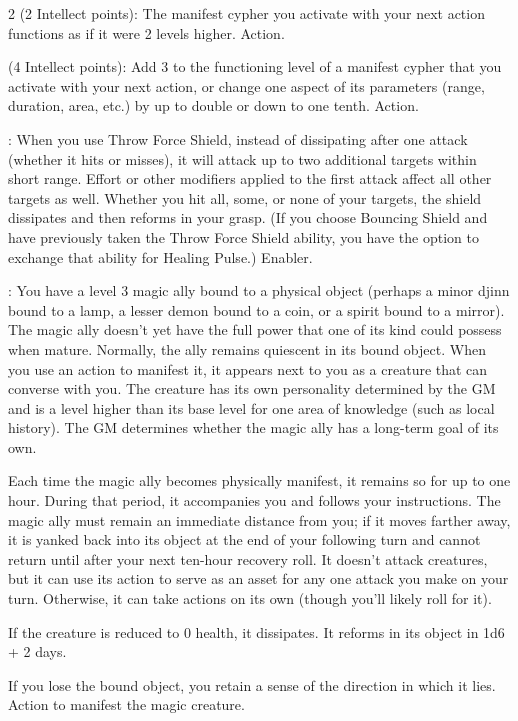\begin{multicols}{2}
 (2 Intellect points): The manifest cypher you activate with your next action functions as if it were 2 levels higher. Action.

 (4 Intellect points): Add 3 to the functioning level of a manifest cypher that you activate with your next action, or change one aspect of its parameters (range, duration, area, etc.) by up to double or down to one tenth. Action.

: When you use Throw Force Shield, instead of dissipating after one attack (whether it hits or misses), it will attack up to two additional targets within short range. Effort or other modifiers applied to the first attack affect all other targets as well. Whether you hit all, some, or none of your targets, the shield dissipates and then reforms in your grasp. (If you choose Bouncing Shield and have previously taken the Throw Force Shield ability, you have the option to exchange that ability for Healing Pulse.) Enabler. 

: You have a level 3 magic ally bound to a physical object (perhaps a minor djinn bound to a lamp, a lesser demon bound to a coin, or a spirit bound to a mirror). The magic ally doesn’t yet have the full power that one of its kind could possess when mature. Normally, the ally remains quiescent in its bound object. When you use an action to manifest it, it appears next to you as a creature that can converse with you. The creature has its own personality determined by the GM and is a level higher than its base level for one area of knowledge (such as local history). The GM determines whether the magic ally has a long-term goal of its own.

Each time the magic ally becomes physically manifest, it remains so for up to one hour. During that period, it accompanies you and follows your instructions. The magic ally must remain an immediate distance from you; if it moves farther away, it is yanked back into its object at the end of your following turn and cannot return until after your next ten-hour recovery roll. It doesn’t attack creatures, but it can use its action to serve as an asset for any one attack you make on your turn. Otherwise, it can take actions on its own (though you’ll likely roll for it). 

If the creature is reduced to 0 health, it dissipates. It reforms in its object in 1d6 + 2 days. 

If you lose the bound object, you retain a sense of the direction in which it lies. Action to manifest the magic creature. 


\end{multicols}
